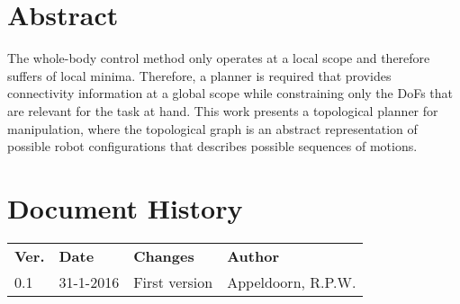 \section*{Abstract}
The whole-body control method only operates at a local scope and therefore suffers of local minima. Therefore, a planner is required that provides connectivity information at a global scope while constraining only the DoFs that are relevant for the task at hand. This work presents a topological planner for manipulation, where the topological graph is an abstract representation of possible robot configurations that describes possible sequences of motions.

\section*{Document History}

\begin{tabular}{|p{1cm}|p{2cm}|p{7.3cm}|p{4cm}|}
\hline
\rowcolor[gray]{0.8}
\multicolumn{4}{|l|}{\bf Document History}\\
\hline
\rowcolor[gray]{0.8}
\bf Ver. & \bf Date & \bf Changes & \bf Author\\
\hline
0.1 
	& 31-1-2016
	& First version
	& Appeldoorn, R.P.W.
	\\
\hline
\end{tabular}


\vfill\eject